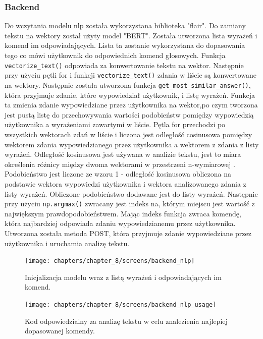 \subsubsection{Backend}
Do wczytania modelu nlp została wykorzystana biblioteka "flair". Do zamiany tekstu na wektory został użyty model "BERT". Została utworzona lista wyrażeń i komend im odpowiadających. Lista ta zostanie  wykorzystana do dopasowania tego co mówi użytkownik do odpowiednich komend głosowych. Funkcja \texttt{vectorize\_text()} odpowiada za konwertowanie tekstu na wektor. Następnie przy użyciu pętli for i funkcji \texttt{vectorize\_text()} zdania w liście są konwertowane na wektory. Następnie została utworzona funkcja \texttt{get\_most\_similar\_answer()}, która przyjmuje zdanie, które wypowiedział użytkownik, i listę wyrażeń. Funkcja ta zmienia zdanie wypowiedziane przez użytkownika na wektor,po czym tworzona jest pustą listę do przechowywania wartości podobieństw pomiędzy wypowiedzią użytkownika a wyrażeniami zawartymi w liście. Pętla for przechodzi po wszystkich wektorach zdań w liście i liczona jest odległość cosinusowa pomiędzy wektorem zdania wypowiedzianego przez użytkownika a wektorem z zdania z listy wyrażeń. Odległość kosinusowa jest używana w analizie tekstu, jest to miara określenia różnicy między dwoma wektorami w przestrzeni n-wymiarowej \cite{dataMining}. Podobieństwo jest liczone ze wzoru 1 - odległość kosinusowa obliczona na podstawie wektora wypowiedzi użytkownika i wektora analizowanego zdania z listy wyrażeń. Obliczone podobieństwo dodawane jest do listy wyrażeń. Następnie przy użyciu \texttt{np.argmax()} zwracany jest indeks na, którym miejscu jest wartość z największym prawdopodobieństwem. Mając indeks funkcja zwraca komendę, która  najbardziej odpowiada zdaniu wypowiedzianemu przez użytkownika. Utworzona została metoda POST, która przyjmuje zdanie wypowiedziane przez użytkownika i uruchamia analizę tekstu.


\begin{figure}[H]
    \centering
    \texttt{[image: chapters/chapter\_8/screens/backend\_nlp]}
    \caption{Inicjalizacja modelu wraz z listą wyrażeń i odpowiadających im komend.}
    \label{img:backend_nlp}
\end{figure}


\begin{figure}[H]
    \centering
    \texttt{[image: chapters/chapter\_8/screens/backend\_nlp\_usage]}
    \caption{Kod odpowiedzialny za analizę tekstu w celu znalezienia najlepiej dopasowanej komendy.}
    \label{img:backend_nlp_usage}
\end{figure}

